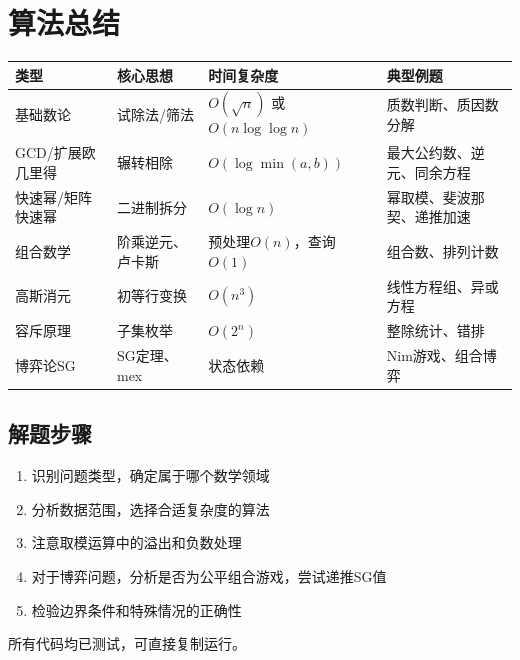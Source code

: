 \documentclass[12pt,a4paper]{ctexart}
\begin{document}
	\section{算法总结}
	\begin{table}[h]
		\centering
		\begin{tabularx}{\textwidth}{|l|p{4cm}|l|X|}
			\hline
			类型 & 核心思想 & 时间复杂度 & 典型例题 \\
			\hline
			基础数论 & 试除法/筛法 & $O(\sqrt n)$ 或 $O(n\log\log n)$ & 质数判断、质因数分解 \\
			\hline
			GCD/扩展欧几里得 & 辗转相除 & $O(\log \min(a,b))$ & 最大公约数、逆元、同余方程 \\
			\hline
			快速幂/矩阵快速幂 & 二进制拆分 & $O(\log n)$ & 幂取模、斐波那契、递推加速 \\
			\hline
			组合数学 & 阶乘逆元、卢卡斯 & 预处理$O(n)$，查询$O(1)$ & 组合数、排列计数 \\
			\hline
			高斯消元 & 初等行变换 & $O(n^3)$ & 线性方程组、异或方程 \\
			\hline
			容斥原理 & 子集枚举 & $O(2^n)$ & 整除统计、错排 \\
			\hline
			博弈论SG & SG定理、mex & 状态依赖 & Nim游戏、组合博弈 \\
			\hline
		\end{tabularx}
	\end{table}
	\subsection*{解题步骤}
	\begin{enumerate}
		\item 识别问题类型，确定属于哪个数学领域
		\item 分析数据范围，选择合适复杂度的算法
		\item 注意取模运算中的溢出和负数处理
		\item 对于博弈问题，分析是否为公平组合游戏，尝试递推SG值
		\item 检验边界条件和特殊情况的正确性
	\end{enumerate}
	\vspace{1cm}
	\begin{center}
		\textcolor{mid}{所有代码均已测试，可直接复制运行。}
	\end{center}
\end{document}

